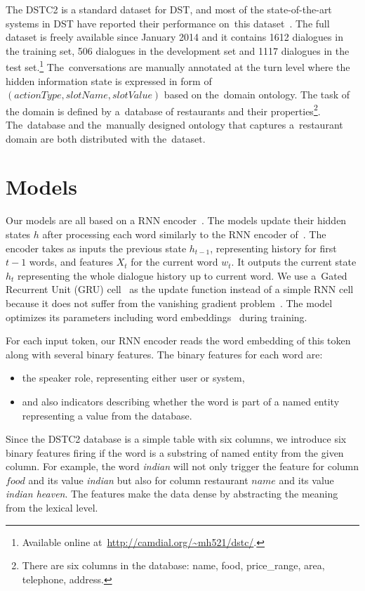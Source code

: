 \documentclass{itatnew}
\begin{document}
The DSTC2 is a standard dataset for DST, and most of the state-of-the-art systems in DST have reported their performance on~this dataset~\cite{henderson2014second}. 
The full dataset is freely available since January 2014 and it contains 1612 dialogues in the training set, 506 dialogues in the development set and 1117 dialogues in the test set.\footnote{Available online at~\url{http://camdial.org/~mh521/dstc/}.}
The~conversations are manually annotated at the turn level where the hidden information state is expressed in form of $(actionType, slotName, slotValue)$ based on the~domain ontology.
The task of the domain is defined by a~database of restaurants and their properties\footnote{There are six columns in the database: name, food, price\_range, area, telephone, address.}.
The~database and the~manually designed ontology that captures a~restaurant domain are both distributed with the~dataset.

\section{Models}\label{sec:model}
Our models are all based on a RNN encoder~\cite{werbos1990backpropagation}. 
The models update their hidden states $h$ after processing each word similarly to the RNN encoder of~\citet{zilka2015incremental}.
The encoder takes as inputs the previous state $h_{t-1}$, representing history for first $t-1$ words, and features $X_t$ for the current word $w_t$. 
It outputs the current state $h_t$ representing the whole dialogue history up to current word.
We use a~Gated Recurrent Unit (GRU) cell~\cite{cho2014gru} as the update function instead of a simple RNN cell because it does not suffer from the vanishing gradient problem~\cite{hochreiter2001gradient}.
The model optimizes its parameters including word embeddings~\cite{bengio2003neural} during training.

For each input token, our RNN encoder reads the word embedding of this token along with several binary features. 
The binary features for each word are:
\begin{itemize}
	\item the speaker role, representing either user or system,
    \item and also indicators describing whether the word is part of a named entity representing a value from the database.
\end{itemize}
Since the DSTC2 database is a simple table with six columns, we introduce six binary features firing if the word is a substring of named entity from the given column.
For example, the word {\it indian} will not only trigger the feature for column $food$ and its value {\it indian} but also for column restaurant $name$ and its value {\it indian heaven}.
The features make the data dense by abstracting the meaning from the lexical level. 
\end{document}
